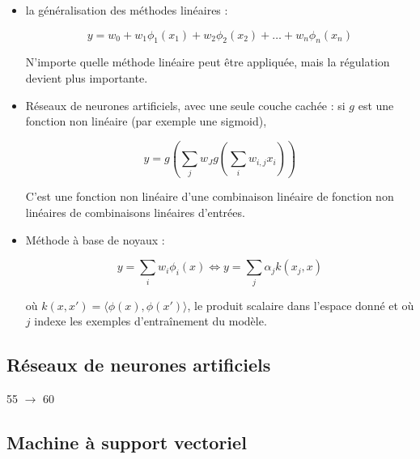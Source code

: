 \documentclass[10pt,a4paper]{report}
\begin{document}
			\begin{itemize}
				\item la généralisation des méthodes linéaires :
				
				$$y = w_0 + w_1 \phi_1(x_1) + w_2 \phi_2(x_2) + \dots + w_n \phi_n(x_n)$$
				
				N'importe quelle méthode linéaire peut être appliquée, mais la régulation devient plus importante.
				
				\item Réseaux de neurones artificiels, avec une seule couche cachée : si $g$ est une fonction non linéaire (par exemple une sigmoid),
				
				$$y = g(\sum_j w_J g(\sum_i w_{i, j} x_i))$$
				
				C'est une fonction non linéaire d'une combinaison linéaire de fonction non linéaires de combinaisons linéaires d'entrées.
				
				\item Méthode à base de noyaux :
				
				$$y = \sum_i w_i \phi_i(x) \Leftrightarrow y = \sum_j \alpha_j k(x_j, x)$$
				
				où $k(x, x') = \langle \phi(x), \phi(x') \rangle$, le produit scalaire dans l'espace donné et où $j$ indexe les exemples d'entraînement du modèle.
			\end{itemize}
	
		\subsection{Réseaux de neurones artificiels}
		
		55 $\rightarrow$ 60
		
		\subsection{Machine à support vectoriel}
	
\end{document}
